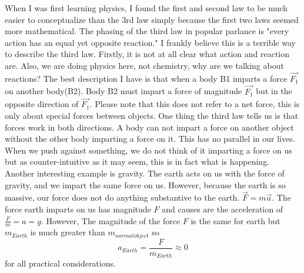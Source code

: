 \documentclass{article}[gray]
\numberwithin{equation}{subsection}
\begin{document}
When I was first learning physics, I found the first and second law to be much easier to conceptualize than the 3rd law simply because the first two laws seemed more mathematical. The phasing of the third law in popular parlance is "every action has an equal yet opposite reaction." I frankly believe this is a terrible way to describe the third law. Firstly, it is not at all clear what action and reaction are. Also, we are doing physics here, not chemistry, why are we talking about reactions? The best description I have is that when a body B1 imparts a force  $\vec{F_1}$ on another body(B2). Body B2 must impart a force of magnitude $\vec{F_1}$ but in the opposite direction of $\vec{F_1}$. Please note that this does not refer to a net force, this is only about special forces between objects. One thing the third law tells us is that forces work in both directions. A body can not impart a force on another object without the other body imparting a force on it. This has no parallel in our lives. When we push against something, we do not think of it imparting a force on us but as counter-intuitive as it may seem, this is in fact what is happening. Another interesting example is gravity. The earth acts on us with the force of gravity, and we impart the same force on us. However, because the earth is so massive, our force does not do anything substantive to the earth. $\vec{F} =m\vec{a}$. The force earth imparts on us has magnitude $F$ and causes are the acceleration of $\frac{F}{m}=a=g$. However, The magnitude of the force $F$ is the same for earth but $m_{Earth}$ is much greater than $m_{normal object}$ so $$a_{Earth}=\frac{F}{m_{Earth}}\approx0$$ for all practical considerations.
\end{document}
